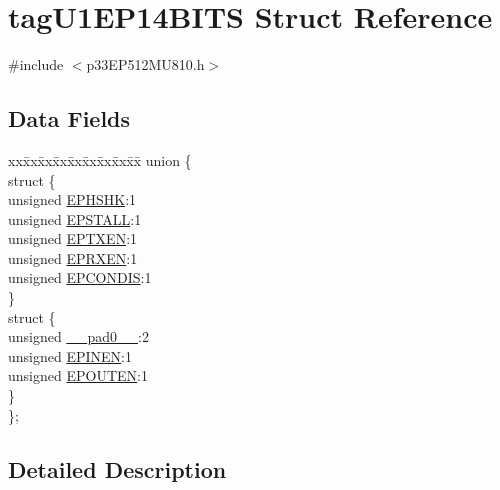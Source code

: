\hypertarget{structtag_u1_e_p14_b_i_t_s}{}\section{tag\+U1\+E\+P14\+B\+I\+TS Struct Reference}
\label{structtag_u1_e_p14_b_i_t_s}


{\ttfamily \#include $<$p33\+E\+P512\+M\+U810.\+h$>$}

\subsection*{Data Fields}
\begin{DoxyCompactItemize}
\item 
\begin{tabbing}
xx\=xx\=xx\=xx\=xx\=xx\=xx\=xx\=xx\=\kill
union \{\\
\>struct \{\\
\>\>unsigned \hyperlink{structtag_u1_e_p14_b_i_t_s_a0d06430217cb4b189fbe9d0c4b460482}{EPHSHK}:1\\
\>\>unsigned \hyperlink{structtag_u1_e_p14_b_i_t_s_a47042104f04ebe06a23f9789bd400d7e}{EPSTALL}:1\\
\>\>unsigned \hyperlink{structtag_u1_e_p14_b_i_t_s_aa2d88c1be513e759c136823c86a355b4}{EPTXEN}:1\\
\>\>unsigned \hyperlink{structtag_u1_e_p14_b_i_t_s_a8a388d32ceffb87230e660b6793f2857}{EPRXEN}:1\\
\>\>unsigned \hyperlink{structtag_u1_e_p14_b_i_t_s_a1bd26df05d2b5a11b20ee548fce90c3e}{EPCONDIS}:1\\
\>\} \\
\>struct \{\\
\>\>unsigned \hyperlink{structtag_u1_e_p14_b_i_t_s_adf71f3d8410c1f1dbbc96680a92c49af}{\_\_pad0\_\_}:2\\
\>\>unsigned \hyperlink{structtag_u1_e_p14_b_i_t_s_a8b6d98cdf233ac90ff19d16d9a89215e}{EPINEN}:1\\
\>\>unsigned \hyperlink{structtag_u1_e_p14_b_i_t_s_adf87e8acfbb27a5626e21b3e3bd106fd}{EPOUTEN}:1\\
\>\} \\
\}; \\

\end{tabbing}\end{DoxyCompactItemize}


\subsection{Detailed Description}


